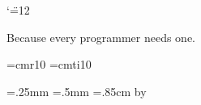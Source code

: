 \catcode`\"=12

Because every programmer needs one.
\hbox{}\vfill\hbox{}\eject


\def\titlefont{\SansSerif \pointSize:10 \Style:roman }
\def\titlefont{\sffamily}
\def\bitfont{\SerifFont \pointSize:7 \Style:Roman }
\def\bitfont{\sffamily\small}
\def\codefont{\SansSerif \pointSize:5 \Style:roman }
\def\codefont{\sffamily\tiny}
\def\namefont{\SansSerif \pointSize:11 \Style:roman }
\let\namefont\relax
\let\commentfont\titlefont
\font\cmtenrm=cmr10 \font\cmtenit=cmti10

\newdimen\thinlinewidth \thinlinewidth=.25mm
\newdimen\fatlinewidth \fatlinewidth=.5mm
\newdimen\rowheight \rowheight=.85cm %
\newdimen\colwidth  \colwidth=1.2cm %
\newdimen\Colwidth {}\colwidth
  \advance\Colwidth by \thinlinewidth
\newdimen\topwhite \topwhite=2pt
\newdimen\botwhite \botwhite=3pt
\newdimen\leftwhite \leftwhite=0pt %
\newdimen\rightwhite \rightwhite=1pt %
\newcount\rowcount 
\newcount\colcount 
{} %
\newcount\thenumber

\def\\{$\backslash$}\def\-{\_$\!$\_}\def\^{\char94}
\def\hh#1{\char'136\char'136 {#1}\ignorespaces}
\def\thinline{\vrule width \thinlinewidth}
\def\fatline{\vrule width \fatlinewidth}

\def\calcnumber{{\multiply\colcount by 16
                 \advance\colcount by \rowcount
                 \global\thenumber=\colcount}}
\def\deccode{\number\thenumber}
\def\octcode{{\ifnum\thenumber>63
                            \advance\thenumber by -64
                            \count0=\thenumber \divide\count0 by 8
                            1\number\count0
              \else         \count0=\thenumber \divide\count0 by 8
                            \ifnum\count0>0 \number\count0 \fi\fi
              \multiply\count0 by 8
              \advance\thenumber by -\count0
              \number\thenumber}}
\def\hexdigit#1{\ifcase#1 0\or 1\or 2\or 3\or 4\or 5\or 6\or 7\or
                          8\or 9\or A\or B\or C\or D\or E\or F\or
                          \edef\tmp{\message{illegal hex digit 
                                        \number#1}}\tmp
                          \fi}
\def\hexcode{{\count0=\thenumber \divide\count0 by 16
              \ifnum\count0>0 \hexdigit{\count0}\fi
              \multiply\count0 by 16
              \advance\thenumber by -\count0 \count0=\thenumber
              \hexdigit{\count0}}}

